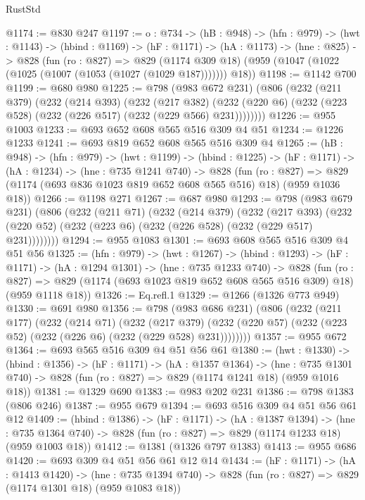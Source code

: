 \begin{lexlean}{RustStd}
\begin{coremodule}
{\begin{coremodule}
@1174 := @830 @247
@1197 := {o : @734} ->
  (hB : @948) ->
  (hfn : @979) ->
  (hwt : @1143) ->
  (hbind : @1169) ->
  (hF : @1171) ->
  (hA : @1173) ->
  (hne : @825) ->
  @828
    (fun (ro : @827) =>
    @829 (@1174 @309 @18) (@959 (@1047 (@1022 (@1025 (@1007 (@1053 (@1027 (@1029 @187))))))) @18))
@1198 := @1142 @700
@1199 := @680 @980
@1225 := @798
    (@983 @672 @231)
    (@806
      (@232
        (@211 @379)
        (@232
          (@214 @393)
          (@232
            (@217 @382)
            (@232 (@220 @6) (@232 (@223 @528) (@232 (@226 @517) (@232 (@229 @566) @231))))))))
@1226 := @955 @1003
@1233 := @693 @652 @608 @565 @516 @309 @4 @51
@1234 := @1226 @1233
@1241 := @693 @819 @652 @608 @565 @516 @309 @4
@1265 := (hB : @948) ->
  (hfn : @979) ->
  (hwt : @1199) ->
  (hbind : @1225) ->
  (hF : @1171) ->
  (hA : @1234) ->
  (hne : @735 @1241 @740) ->
  @828
    (fun (ro : @827) =>
    @829 (@1174 (@693 @836 @1023 @819 @652 @608 @565 @516) @18) (@959 @1036 @18))
@1266 := @1198 @271
@1267 := @687 @980
@1293 := @798
    (@983 @679 @231)
    (@806
      (@232
        (@211 @71)
        (@232
          (@214 @379)
          (@232
            (@217 @393)
            (@232 (@220 @52) (@232 (@223 @6) (@232 (@226 @528) (@232 (@229 @517) @231))))))))
@1294 := @955 @1083
@1301 := @693 @608 @565 @516 @309 @4 @51 @56
@1325 := (hfn : @979) ->
  (hwt : @1267) ->
  (hbind : @1293) ->
  (hF : @1171) ->
  (hA : @1294 @1301) ->
  (hne : @735 @1233 @740) ->
  @828
    (fun (ro : @827) =>
    @829 (@1174 (@693 @1023 @819 @652 @608 @565 @516 @309) @18) (@959 @1118 @18))
@1326 := Eq.refl.{1}
@1329 := @1266 (@1326 @773 @949)
@1330 := @691 @980
@1356 := @798
    (@983 @686 @231)
    (@806
      (@232
        (@211 @177)
        (@232
          (@214 @71)
          (@232
            (@217 @379)
            (@232 (@220 @57) (@232 (@223 @52) (@232 (@226 @6) (@232 (@229 @528) @231))))))))
@1357 := @955 @672
@1364 := @693 @565 @516 @309 @4 @51 @56 @61
@1380 := (hwt : @1330) ->
  (hbind : @1356) ->
  (hF : @1171) ->
  (hA : @1357 @1364) ->
  (hne : @735 @1301 @740) -> @828 (fun (ro : @827) => @829 (@1174 @1241 @18) (@959 @1016 @18))
@1381 := @1329 @690
@1383 := @983 @202 @231
@1386 := @798 @1383 (@806 @246)
@1387 := @955 @679
@1394 := @693 @516 @309 @4 @51 @56 @61 @12
@1409 := (hbind : @1386) ->
  (hF : @1171) ->
  (hA : @1387 @1394) ->
  (hne : @735 @1364 @740) -> @828 (fun (ro : @827) => @829 (@1174 @1233 @18) (@959 @1003 @18))
@1412 := @1381 (@1326 @797 @1383)
@1413 := @955 @686
@1420 := @693 @309 @4 @51 @56 @61 @12 @14
@1434 := (hF : @1171) ->
  (hA : @1413 @1420) ->
  (hne : @735 @1394 @740) -> @828 (fun (ro : @827) => @829 (@1174 @1301 @18) (@959 @1083 @18))

\end{coremodule}}
\end{coremodule}
\end{lexlean}
